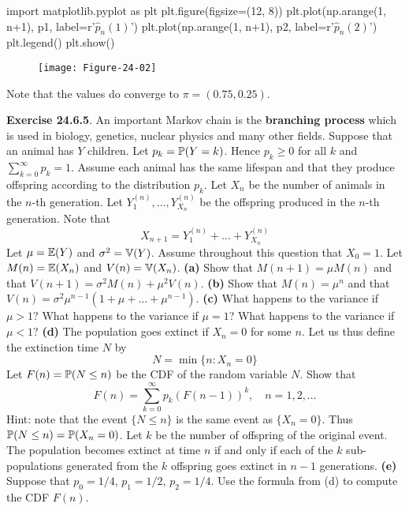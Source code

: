 \begin{python}
import matplotlib.pyplot as plt
plt.figure(figsize=(12, 8))
plt.plot(np.arange(1, n+1), p1, label=r'$\hat{p}_{n}(1)$')
plt.plot(np.arange(1, n+1), p2, label=r'$\hat{p}_{n}(2)$')
plt.legend()
plt.show()
\end{python}

\begin{figure}[H]
\centering
\texttt{[image: Figure-24-02]}
\end{figure}

Note that the values do converge to \(\pi = (0.75, 0.25)\).

\textbf{Exercise 24.6.5}. An important Markov chain is the
\textbf{branching process} which is used in biology, genetics, nuclear
physics and many other fields. Suppose that an animal has \(Y\)
children. Let \(p_{k} = \operatorname{\mathbb{P}}(Y = k)\). Hence \(p_{k} \geq 0\) for all
\(k\) and \(\sum_{k = 0}^{\infty} p_{k} = 1\). Assume each animal has the
same lifespan and that they produce offspring according to the
distribution \(p_{k}\). Let \(X_{n}\) be the number of animals in the
\(n\)-th generation. Let \(Y_{1}^{(n)}, \dots, Y_{X_{n}}^{(n)}\) be the
offspring produced in the \(n\)-th generation. Note that
\[
X_{n+1} = Y_{1}^{(n)} + \dots + Y_{X_{n}}^{(n)}
\]
Let \(\mu = \operatorname{\mathbb{E}}(Y)\) and \(\sigma^{2} = \operatorname{\mathbb{V}}(Y)\). Assume
throughout this question that \(X_{0} = 1\). Let
\(M(n) = \operatorname{\mathbb{E}}(X_{n})\) and \(V(n) = \operatorname{\mathbb{V}}(X_{n})\).
\textbf{(a)} Show that \(M(n + 1) = \mu M(n)\) and that $V(n + 1) =
\sigma^{2} M(n) + \mu^{2} V(n) $.
\textbf{(b)} Show that \(M(n) = \mu^{n}\) and that
\(V(n) = \sigma^{2} \mu^{n-1} (1 + \mu + \dots + \mu^{n - 1})\).
\textbf{(c)} What happens to the variance if \(\mu > 1\)? What happens
to the variance if \(\mu = 1\)? What happens to the variance if
\(\mu < 1\)?
\textbf{(d)} The population goes extinct if \(X_{n} = 0\) for some \(n\).
Let us thus define the extinction time \(N\) by
\[
N = \min \{ n : X_{n} = 0 \}
\]
Let \(F(n) = \operatorname{\mathbb{P}}(N \leq n)\) be the CDF of the random variable
\(N\). Show that
\[
F(n) = \sum_{k=0}^{\infty} p_{k} \left( F(n - 1) \right)^{k}, \quad n = 1, 2, \dots
\]
Hint: note that the event \(\{ N \leq n \}\) is the same event as
\(\{ X_{n} = 0 \}\). Thus \(\operatorname{\mathbb{P}}(N \leq n) = \operatorname{\mathbb{P}}(X_{n} = 0)\).
Let \(k\) be the number of offspring of the original event. The
population becomes extinct at time \(n\) if and only if each of the
\(k\) sub-populations generated from the \(k\) offspring goes extinct in
\(n - 1\) generations.
\textbf{(e)} Suppose that \(p_{0} = 1/4\), \(p_{1} = 1/2\), \(p_{2} = 1/4\).
Use the formula from (d) to compute the CDF \(F(n)\).

